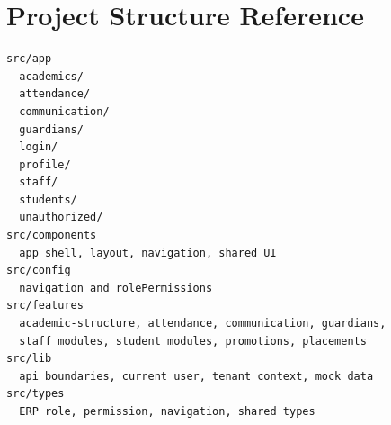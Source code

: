\chapter{Project Structure Reference}
\label{app:project-structure}
\begin{lstlisting}
src/app
  academics/
  attendance/
  communication/
  guardians/
  login/
  profile/
  staff/
  students/
  unauthorized/
src/components
  app shell, layout, navigation, shared UI
src/config
  navigation and rolePermissions
src/features
  academic-structure, attendance, communication, guardians,
  staff modules, student modules, promotions, placements
src/lib
  api boundaries, current user, tenant context, mock data
src/types
  ERP role, permission, navigation, shared types
\end{lstlisting}
